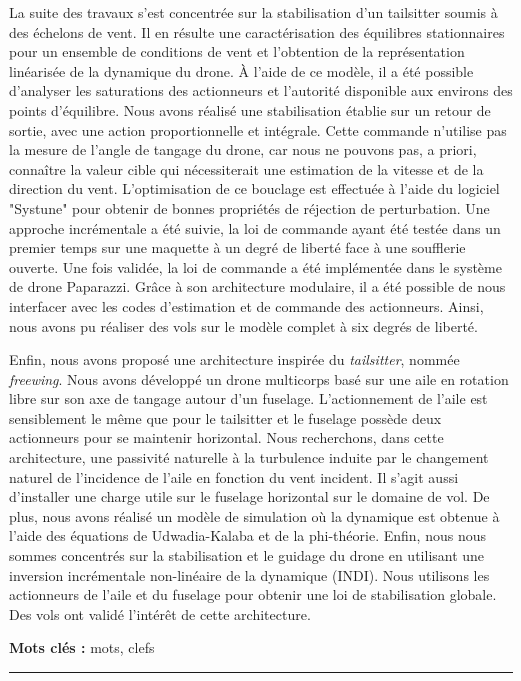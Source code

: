 \begin{vcenterpage}
La suite des travaux s'est concentrée sur la stabilisation d'un tailsitter soumis à des échelons de vent. Il en résulte une caractérisation des équilibres stationnaires pour un ensemble de conditions de vent et l'obtention de la représentation linéarisée de la dynamique du drone. À l'aide de ce modèle, il a été possible d'analyser les saturations des actionneurs et l'autorité disponible aux environs des points d'équilibre. Nous avons réalisé une stabilisation établie sur un retour de sortie, avec une action proportionnelle et intégrale. Cette commande n'utilise pas la mesure de l'angle de tangage du drone, car nous ne pouvons pas, a priori, connaître la valeur cible qui nécessiterait une estimation de la vitesse et de la direction du vent. L'optimisation de ce bouclage est effectuée à l'aide du logiciel "Systune" pour obtenir de bonnes propriétés de réjection de perturbation. Une approche incrémentale a été suivie, la loi de commande ayant été testée dans un premier temps sur une maquette à un degré de liberté face à une soufflerie ouverte. Une fois validée, la loi de commande a été implémentée dans le système de drone Paparazzi. Grâce à son architecture modulaire, il a été possible de nous interfacer avec les codes d'estimation et de commande des actionneurs. Ainsi, nous avons pu réaliser des vols sur le modèle complet à six degrés de liberté.

Enfin, nous avons proposé une architecture inspirée du \textit{tailsitter}, nommée \textit{freewing}. Nous avons développé un drone multicorps basé sur une aile en rotation libre sur son axe de tangage autour d'un fuselage. L'actionnement de l'aile est sensiblement le même que pour le tailsitter et le fuselage possède deux actionneurs pour se maintenir horizontal. Nous recherchons, dans cette architecture, une passivité naturelle à la turbulence induite par le changement naturel de l'incidence de l'aile en fonction du vent incident. Il s'agit aussi d'installer une charge utile sur le fuselage horizontal sur le domaine de vol. De plus, nous avons réalisé un modèle de simulation où la dynamique est obtenue à l'aide des équations de Udwadia-Kalaba et de la phi-théorie. Enfin, nous nous sommes concentrés sur la stabilisation et le guidage du drone en utilisant une inversion incrémentale non-linéaire de la dynamique (INDI). Nous utilisons les actionneurs de l'aile et du fuselage pour obtenir une loi de stabilisation globale. Des vols ont validé l'intérêt de cette architecture.

{\large\textbf{Mots clés :}}
mots, clefs

\noindent\rule[2pt]{\textwidth}{0.5pt}
\end{vcenterpage}

